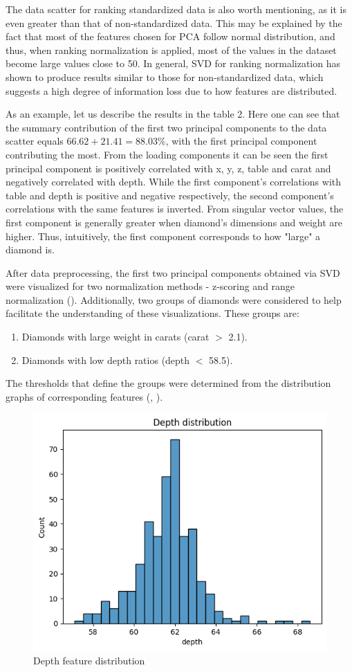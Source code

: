 \documentclass[12pt,a4paper]{article}
\begin{document}
	The data scatter for ranking standardized data is also worth mentioning, as it is even greater than that of non-standardized data. This may be explained by the fact that most of the features chosen for PCA follow normal distribution, and thus, when ranking normalization is applied, most of the values in the dataset become large values close to 50. In general, SVD for ranking normalization has shown to produce results similar to those for non-standardized data, which suggests a high degree of information loss due to how features are distributed.
	
	As an example, let us describe the results in the table 2. Here one can see that the summary contribution of the first two principal components to the data scatter equals $66.62 + 21.41 = 88.03\%$, with the first principal component contributing the most. From the loading components it can be seen the first principal component is positively correlated with x, y, z, table and carat and negatively correlated with depth. While the first component's correlations with table and depth is positive and negative respectively, the second component's correlations with the same features is inverted. From singular vector values, the first component is generally greater when diamond's dimensions and weight are higher. Thus, intuitively, the first component corresponds to how "large" a diamond is.
	
	After data preprocessing, the first two principal components obtained via SVD were visualized for two normalization methods - z-scoring and range normalization (). Additionally, two groups of diamonds were considered to help facilitate the understanding of\newline
	\newpage
	\noindent  these visualizations. These groups are:
	
	\begin{enumerate}
		\itemsep 0pt
		\item Diamonds with large weight in carats (carat $>$ 2.1).
		\item Diamonds with low depth ratios (depth $<$ 58.5).
	\end{enumerate}
	
	
	The thresholds that define the groups were determined from the distribution graphs of corresponding features (, ).
	
	\begin{figure}[hbtp]
		\centering
		\includegraphics[width=.5\textwidth]{media/depthDist.png}
		\caption{Depth feature distribution}
		\label{fig:depthDist}
	\end{figure}
	
\end{document}
